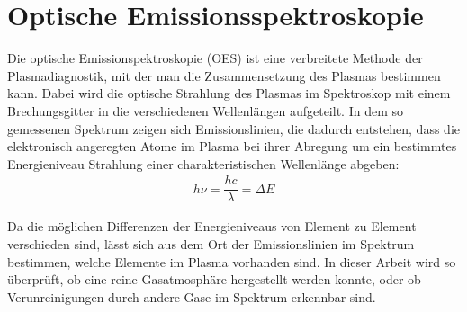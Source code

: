 \section{Optische Emissionsspektroskopie}

Die optische Emissionspektroskopie (OES) ist eine verbreitete Methode der Plasmadiagnostik, mit der man die Zusammensetzung des Plasmas bestimmen kann. Dabei wird die optische Strahlung des Plasmas im Spektroskop mit einem Brechungsgitter in die verschiedenen Wellenlängen aufgeteilt. In dem so gemessenen Spektrum zeigen sich Emissionslinien, die dadurch entstehen, dass die elektronisch angeregten Atome im Plasma bei ihrer Abregung um ein bestimmtes Energieniveau Strahlung einer charakteristischen Wellenlänge abgeben:
\begin{align*}
	h\nu = \dfrac{hc}{\lambda} = \Delta E
\end{align*}

Da die möglichen Differenzen der Energieniveaus von Element zu Element verschieden sind, lässt sich aus dem Ort der Emissionslinien im Spektrum bestimmen, welche Elemente im Plasma vorhanden sind. In dieser Arbeit wird so überprüft, ob eine reine Gasatmosphäre hergestellt werden konnte, oder ob Verunreinigungen durch andere Gase im Spektrum erkennbar sind.